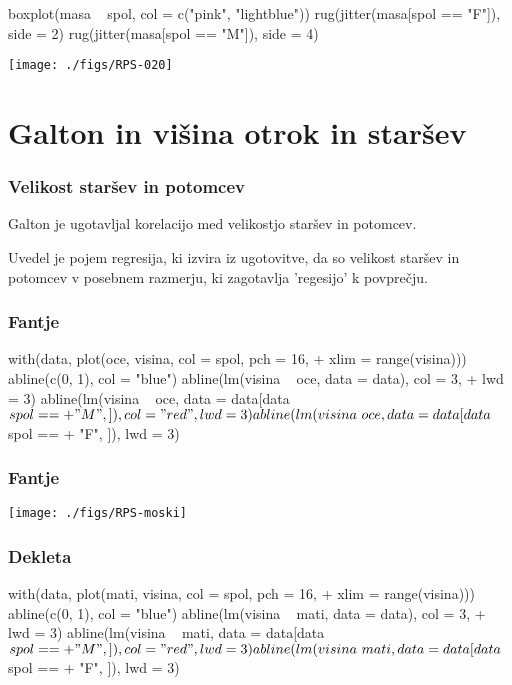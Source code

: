 \begin{Schunk}
\begin{Sinput}
  boxplot(masa ~ spol, col = c("pink", "lightblue"))
  rug(jitter(masa[spol == "F"]), side = 2)
  rug(jitter(masa[spol == "M"]), side = 4)
\end{Sinput}
\end{Schunk}
\texttt{[image: ./figs/RPS-020]}


\clearpage
\section{Galton in višina otrok in staršev}
\begin{frame}[fragile]
\frametitle{Velikost staršev in potomcev}
Galton je ugotavljal korelacijo med velikostjo staršev in potomcev.

Uvedel je pojem regresija, ki izvira iz ugotovitve, da so velikost staršev in potomcev v posebnem razmerju, ki zagotavlja 'regesijo' k povprečju.
\end{frame}

\begin{frame}[fragile]
\frametitle{Fantje}
\begin{Schunk}
\begin{Sinput}
  with(data, plot(oce, visina, col = spol, pch = 16, 
+     xlim = range(visina)))
  abline(c(0, 1), col = "blue")
  abline(lm(visina ~ oce, data = data), col = 3, 
+     lwd = 3)
  abline(lm(visina ~ oce, data = data[data$spol == 
+     "M", ]), col = "red", lwd = 3)
  abline(lm(visina ~ oce, data = data[data$spol == 
+     "F", ]), lwd = 3)
\end{Sinput}
\end{Schunk}
\end{frame}

\begin{frame}[fragile]
\frametitle{Fantje}
\texttt{[image: ./figs/RPS-moski]}
\end{frame}
\clearpage
\begin{frame}[fragile]
\frametitle{Dekleta}
\begin{Schunk}
\begin{Sinput}
  with(data, plot(mati, visina, col = spol, pch = 16, 
+     xlim = range(visina)))
  abline(c(0, 1), col = "blue")
  abline(lm(visina ~ mati, data = data), col = 3, 
+     lwd = 3)
  abline(lm(visina ~ mati, data = data[data$spol == 
+     "M", ]), col = "red", lwd = 3)
  abline(lm(visina ~ mati, data = data[data$spol == 
+     "F", ]), lwd = 3)
\end{Sinput}
\end{Schunk}
\end{frame}


